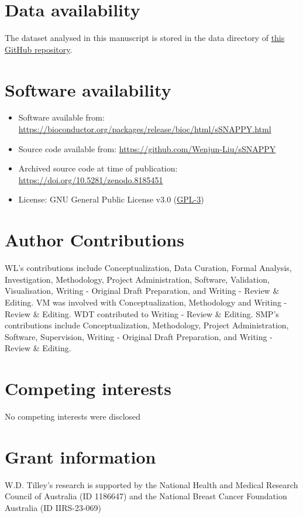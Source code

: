 \documentclass[9pt,a4paper,]{extarticle}
\begin{document}
\hypertarget{data-availability}{%
\section{Data availability}\label{data-availability}}

The dataset analysed in this manuscript is stored in the data directory of \href{https://github.com/Wenjun-Liu/sSNAPPY}{this GitHub repository}.

\hypertarget{software-availability}{%
\section{Software availability}\label{software-availability}}

\begin{itemize}
\item
  Software available from: \url{https://bioconductor.org/packages/release/bioc/html/sSNAPPY.html}
\item
  Source code available from: \url{https://github.com/Wenjun-Liu/sSNAPPY}
\item
  Archived source code at time of publication: \url{https://doi.org/10.5281/zenodo.8185451}
\item
  License: GNU General Public License v3.0 (\href{https://opensource.org/license/gpl-3-0/}{GPL-3})
\end{itemize}

\hypertarget{author-contributions}{%
\section{Author Contributions}\label{author-contributions}}

WL's contributions include Conceptualization, Data Curation, Formal Analysis, Investigation, Methodology, Project Administration, Software, Validation, Visualisation, Writing - Original Draft Preparation, and Writing - Review \& Editing.
VM was involved with Conceptualization, Methodology and Writing - Review \& Editing.
WDT contributed to Writing - Review \& Editing.
SMP's contributions include Conceptualization, Methodology, Project Administration, Software, Supervision, Writing - Original Draft Preparation, and Writing - Review \& Editing.

\hypertarget{competing-interests}{%
\section{Competing interests}\label{competing-interests}}

No competing interests were disclosed

\hypertarget{grant-information}{%
\section{Grant information}\label{grant-information}}

W.D. Tilley's research is supported by the National Health and Medical Research Council of Australia (ID 1186647) and the National Breast Cancer Foundation Australia (ID IIRS-23-069)

\renewcommand\refname{References}
{\small}
\end{document}

